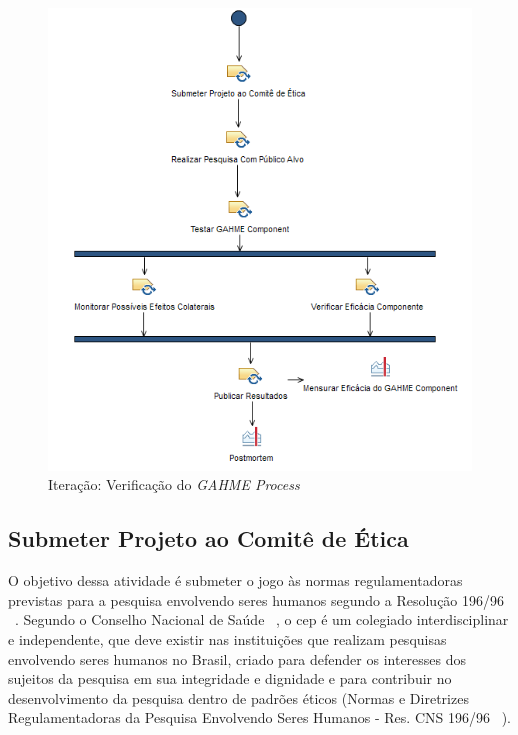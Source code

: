 \begin{figure}
 \centering
 \includegraphics[scale=0.55]{./img/verificar-componente.png}
\caption{Iteração: Verificação do \textit{GAHME Process}}
 \label{fig:verificação}
\end{figure}

\subsection{Submeter Projeto ao Comitê de Ética}
O objetivo dessa atividade é submeter o jogo às normas regulamentadoras previstas para a pesquisa envolvendo seres humanos segundo a Resolução 196/96 ~\cite{conselho2000normas}. Segundo o Conselho Nacional de Saúde ~\cite{conep2002}, o \ac{cep} é um colegiado interdisciplinar e independente,  que deve existir nas instituições que realizam pesquisas envolvendo seres humanos no Brasil, criado para defender os interesses dos sujeitos da pesquisa em sua integridade e dignidade e para contribuir no desenvolvimento da pesquisa dentro de padrões éticos (Normas e Diretrizes Regulamentadoras da Pesquisa Envolvendo Seres Humanos - Res. CNS 196/96 ~\cite{conselho2000normas}). 

